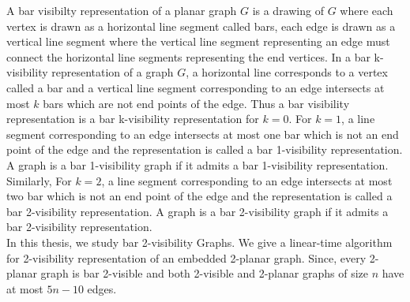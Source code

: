 
A bar visibilty representation of a planar graph $G$ is a drawing of $G$ where each vertex is drawn as a horizontal line segment called bars, each edge is drawn as a vertical line segment where the vertical line segment representing an edge must connect the horizontal line segments representing the end vertices. In a bar k-visibility representation of a graph $G$, a horizontal line corresponds to a vertex called a bar and a vertical line segment corresponding to an edge intersects at most $k$ bars which are not end points of the edge. Thus a bar visibility representation is a bar k-visibility representation for $k = 0$. For $k = 1$, a line segment corresponding to an edge intersects at most one bar which is not an end point of the edge and the representation is called a bar 1-visibility representation. A graph is a bar 1-visibility graph if it admits a bar 1-visibility representation. Similarly, For $k = 2$, a line segment corresponding to an edge intersects at most two bar which is not an end point of the edge and the representation is called a bar 2-visibility representation. A graph is a bar 2-visibility graph if it admits a bar 2-visibility representation.
\\

In this thesis, we study bar 2-visibility Graphs. We give a linear-time algorithm for 2-visibility representation of an embedded 2-planar graph. Since, every 2-planar graph is bar 2-visible and both 2-visible and 2-planar graphs of size $n$ have at most $5n-10$ edges.

\endinput